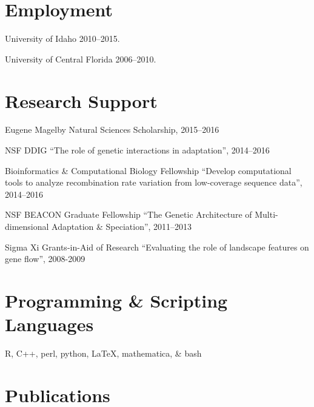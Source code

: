 \documentclass[letterpaper]{article}
\renewenvironment{itemize}{
  \begin{list}{}{
    \setlength{\leftmargin}{1.5em}
  }
}{
  \end{list}
}
\begin{document}
\section*{Employment}

\begin{itemize}
\item University of Idaho 2010--2015.
\item University of Central Florida 2006--2010.
\end{itemize}

\section*{Research Support}
\begin{itemize}
\item Eugene Magelby Natural Sciences Scholarship, 2015--2016
\item NSF DDIG ``The role of genetic interactions in adaptation'', 2014--2016
\item Bioinformatics \& Computational Biology Fellowship ``Develop computational tools to analyze recombination rate variation from low-coverage sequence data'', 2014--2016
\item NSF BEACON Graduate Fellowship ``The Genetic Architecture of Multi-dimensional Adaptation \& Speciation'', 2011--2013
\item Sigma Xi Grants-in-Aid of Research ``Evaluating the role of landscape features on gene flow'', 2008-2009
\end{itemize}

\section*{Programming \& Scripting Languages}
\begin{itemize}
\item R, C++, perl, python, \LaTeX , mathematica, \& bash
\end{itemize}

\section*{Publications}
\end{document}
